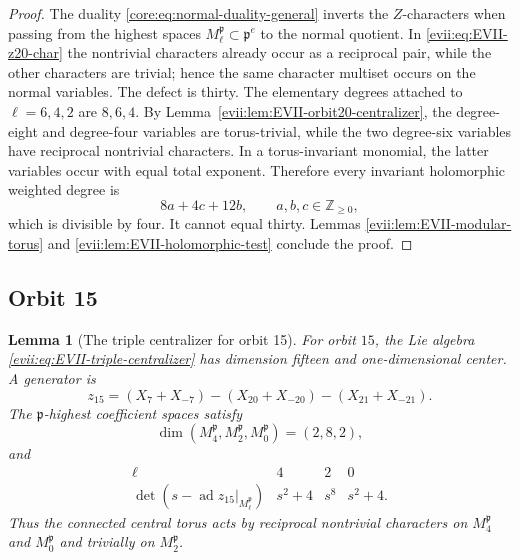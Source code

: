\documentclass[10pt,a4paper]{amsart}
\numberwithin{equation}{section}
\newtheorem{lemma}[theorem]{Lemma}
\newcommand{\Z}{\mathbb Z}
\newcommand{\ad}{\operatorname{ad}}
\newcommand{\fp}{\mathfrak p}
\begin{document}
\begin{proof}
The duality \eqref{core:eq:normal-duality-general} inverts the $Z$-characters when
passing from the highest spaces $M_\ell^{\fp}\subset\fp^e$ to the normal
quotient.  In \eqref{evii:eq:EVII-z20-char} the nontrivial characters already occur
as a reciprocal pair, while the other characters are trivial; hence the same
character multiset occurs on the normal variables.  The defect is thirty.  The elementary degrees attached to
$\ell=6,4,2$ are $8,6,4$.  By Lemma~\ref{evii:lem:EVII-orbit20-centralizer}, the
degree-eight and degree-four variables are torus-trivial, while the two
degree-six variables have reciprocal nontrivial characters.  In a torus-invariant
monomial, the latter variables occur with equal total exponent.  Therefore every
invariant holomorphic weighted degree is
\[
 8a+4c+12b,
 \qquad a,b,c\in\Z_{\ge0},
\]
which is divisible by four.  It cannot equal thirty.  Lemmas
\ref{evii:lem:EVII-modular-torus} and \ref{evii:lem:EVII-holomorphic-test} conclude the
proof.
\end{proof}

\subsection{Orbit 15}

\begin{lemma}[The triple centralizer for orbit 15]\label{evii:lem:EVII-orbit15-centralizer}
For orbit $15$, the Lie algebra \eqref{evii:eq:EVII-triple-centralizer} has dimension
fifteen and one-dimensional center.  A generator is
\begin{equation}\label{evii:eq:EVII-z15}
 z_{15}=(X_7+X_{-7})-(X_{20}+X_{-20})-(X_{21}+X_{-21}).
\end{equation}
The $\fp$-highest coefficient spaces satisfy
\[
 \dim(M_4^{\fp},M_2^{\fp},M_0^{\fp})=(2,8,2),
\]
and
\begin{equation}\label{evii:eq:EVII-z15-char}
\begin{array}{c|ccc}
\ell&4&2&0\\ \hline
\det(s-\ad z_{15}|_{M_\ell^{\fp}})&s^2+4&s^8&s^2+4.
\end{array}
\end{equation}
Thus the connected central torus acts by reciprocal nontrivial characters on
$M_4^{\fp}$ and $M_0^{\fp}$ and trivially on $M_2^{\fp}$.
\end{lemma}
\end{document}

